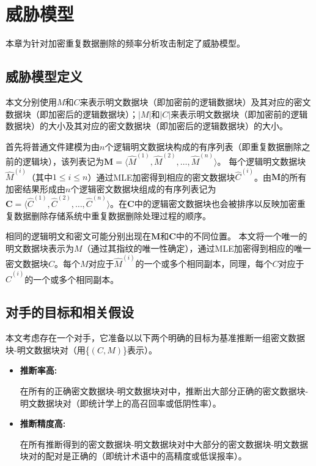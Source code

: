 \chapter{威胁模型}
\label{sec:ThreatModel}
本章为针对加密重复数据删除的频率分析攻击制定了威胁模型。

\section{威胁模型定义}
\label{sec:ThreatModel-Definitions}

本文分别使用$M$和$C$来表示明文数据块（即加密前的逻辑数据块）及其对应的密文数据块（即加密后的逻辑数据块）；$|M|$和$|C|$来表示明文数据块（即加密前的逻辑数据块）的大小及其对应的密文数据块（即加密后的逻辑数据块）的大小。

首先将普通文件建模为由$n$个逻辑明文数据块构成的有序列表（即重复数据删除之前的逻辑块），该列表记为$\mathbf{M} = \langle \hat{M}^{(1)}, \hat{M}^{(2)}, \ldots, \hat{M}^{(n)}\rangle$。 每个逻辑明文数据块$\hat{M}^{(i)}$（其中$1\le i\le n$）通过MLE加密得到相应的密文数据块$\hat{C}^{(i)}$。由$\mathbf{M}$的所有加密结果形成由$n$个逻辑密文数据块组成的有序列表记为$\mathbf{C} = \langle \hat{C}^{(1)}, \hat{C}^{(2)}, \ldots, \hat{C}^{(n)} \rangle$。在$\mathbf{C}$中的逻辑密文数据块也会被排序以反映加密重复数据删除存储系统中重复数据删除处理过程的顺序。

相同的逻辑明文和密文可能分别出现在$\mathbf{M}$和$\mathbf{C}$中的不同位置。 本文将一个唯一的明文数据块表示为$M$（通过其指纹的唯一性确定），通过MLE加密得到相应的唯一密文数据块$C$。每个$M$对应于$\hat{M}^{(i)}$的一个或多个相同副本，同理，每个$C$对应于$\hat{C}^{(i)}$的一个或多个相同副本。


\section{对手的目标和相关假设}
\label{sec:ThreatModel-Assumptions}

本文考虑存在一个对手，它准备以以下两个明确的目标为基准推断一组密文数据块-明文数据块对（用\{$(C, M)$\}表示）。


\begin{itemize}
    \item \textbf{推断率高:} 
    
    在所有的正确密文数据块-明文数据块对中，推断出大部分正确的密文数据块-明文数据块对（即统计学上的高召回率或低阴性率）。

    \item \textbf{推断精度高:} 
    
    在所有推断得到的密文数据块-明文数据块对中大部分的密文数据块-明文数据块对的配对是正确的（即统计术语中的高精度或低误报率）。
\end{itemize}
  
